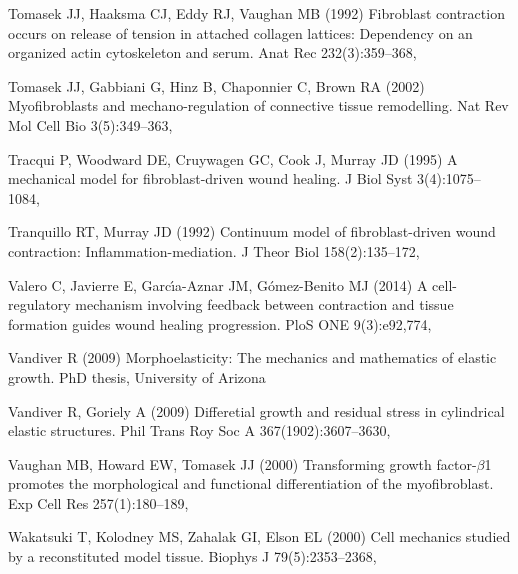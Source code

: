\begin{thebibliography}{124}
Tomasek JJ, Haaksma CJ, Eddy RJ, Vaughan MB (1992) Fibroblast contraction
  occurs on release of tension in attached collagen lattices: Dependency on an
  organized actin cytoskeleton and serum. Anat Rec 232(3):359--368,

Tomasek JJ, Gabbiani G, Hinz B, Chaponnier C, Brown RA (2002) Myofibroblasts
  and mechano-regulation of connective tissue remodelling. Nat Rev Mol Cell Bio
  3(5):349--363, 

Tracqui P, Woodward DE, Cruywagen GC, Cook J, Murray JD (1995) A mechanical
  model for fibroblast-driven wound healing. J Biol Syst 3(4):1075--1084,

Tranquillo RT, Murray JD (1992) Continuum model of fibroblast-driven wound
  contraction: Inflammation-mediation. J Theor Biol 158(2):135--172,

Valero C, Javierre E, Garc{\'\i}a-Aznar JM, G{\'o}mez-Benito MJ (2014) A
  cell-regulatory mechanism involving feedback between contraction and tissue
  formation guides wound healing progression. PloS ONE 9(3):e92,774,

Vandiver R (2009) Morphoelasticity: The mechanics and mathematics of elastic
  growth. PhD thesis, University of Arizona

Vandiver R, Goriely A (2009) Differetial growth and residual stress in
  cylindrical elastic structures. Phil Trans Roy Soc A 367(1902):3607--3630,

Vaughan MB, Howard EW, Tomasek JJ (2000) Transforming growth factor-$\beta$1
  promotes the morphological and functional differentiation of the
  myofibroblast. Exp Cell Res 257(1):180--189, 

Wakatsuki T, Kolodney MS, Zahalak GI, Elson EL (2000) Cell mechanics studied by
  a reconstituted model tissue. Biophys J 79(5):2353--2368,


\end{thebibliography}
